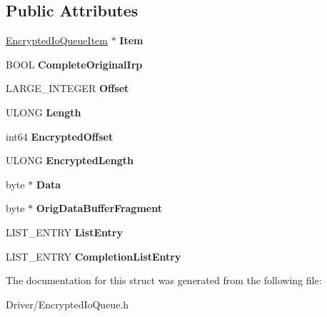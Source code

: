 \subsection*{Public Attributes}
\begin{DoxyCompactItemize}
\item 
\mbox{\label{struct_encrypted_io_request_a70e12b852316855bd7a0b72f682fc13d}} 
\hyperlink{struct_encrypted_io_queue_item}{Encrypted\+Io\+Queue\+Item} $\ast$ {\bfseries Item}
\item 
\mbox{\label{struct_encrypted_io_request_aaba25052de401d1a1e5656bfafbb3b54}} 
B\+O\+OL {\bfseries Complete\+Original\+Irp}
\item 
\mbox{\label{struct_encrypted_io_request_abb7eddecaa71dd7b566b37d39d72a7d5}} 
L\+A\+R\+G\+E\+\_\+\+I\+N\+T\+E\+G\+ER {\bfseries Offset}
\item 
\mbox{\label{struct_encrypted_io_request_a2d4abccc744d6924c59e39ba70658102}} 
U\+L\+O\+NG {\bfseries Length}
\item 
\mbox{\label{struct_encrypted_io_request_aa5eb08079a70a1606e34b6a7020d889c}} 
int64 {\bfseries Encrypted\+Offset}
\item 
\mbox{\label{struct_encrypted_io_request_a250c990882344359e39e4d053775566b}} 
U\+L\+O\+NG {\bfseries Encrypted\+Length}
\item 
\mbox{\label{struct_encrypted_io_request_a82160cd5b1abcb205d3c4223162bdf03}} 
byte $\ast$ {\bfseries Data}
\item 
\mbox{\label{struct_encrypted_io_request_ade6f54db8a51333fa9eacfacf6395676}} 
byte $\ast$ {\bfseries Orig\+Data\+Buffer\+Fragment}
\item 
\mbox{\label{struct_encrypted_io_request_a556fea85d3b3ff2240f791c3cc181872}} 
L\+I\+S\+T\+\_\+\+E\+N\+T\+RY {\bfseries List\+Entry}
\item 
\mbox{\label{struct_encrypted_io_request_a6024146e9928d2e68bee4dd452c3045f}} 
L\+I\+S\+T\+\_\+\+E\+N\+T\+RY {\bfseries Completion\+List\+Entry}
\end{DoxyCompactItemize}


The documentation for this struct was generated from the following file\+:\begin{DoxyCompactItemize}
\item 
Driver/Encrypted\+Io\+Queue.\+h\end{DoxyCompactItemize}
